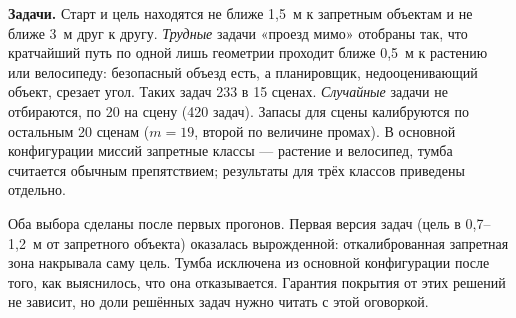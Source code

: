 \textbf{Задачи.} Старт и цель находятся не ближе 1,5~м к запретным объектам и не ближе 3~м друг к другу. \emph{Трудные} задачи «проезд мимо» отобраны так, что кратчайший путь по одной лишь геометрии проходит ближе 0,5~м к растению или велосипеду: безопасный объезд есть, а планировщик, недооценивающий объект, срезает угол. Таких задач 233 в 15 сценах. \emph{Случайные} задачи не отбираются, по 20 на сцену (420 задач). Запасы для сцены калибруются по остальным 20 сценам ($m = 19$, второй по величине промах). В основной конфигурации миссий запретные классы --- растение и велосипед, тумба считается обычным препятствием; результаты для трёх классов приведены отдельно.

Оба выбора сделаны после первых прогонов. Первая версия задач (цель в 0,7--1,2~м от запретного объекта) оказалась вырожденной: откалиброванная запретная зона накрывала саму цель. Тумба исключена из основной конфигурации после того, как выяснилось, что она отказывается. Гарантия покрытия от этих решений не зависит, но доли решённых задач нужно читать с этой оговоркой.
